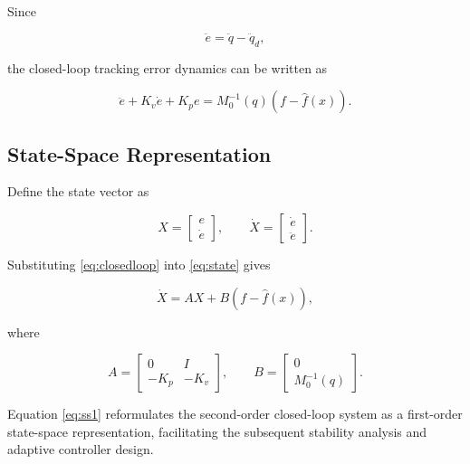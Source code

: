 Since

\begin{equation}
	\ddot e
	=
	\ddot q
	-
	\ddot q_d,
\end{equation}

the closed-loop tracking error dynamics can be written as

\begin{equation}
	\ddot e
	+
	K_v\dot e
	+
	K_pe
	=
	M_0^{-1}(q)
	\left(
	f
	-
	\hat f(x)
	\right).
	\label{eq:closedloop}
\end{equation}


\subsection{State-Space Representation}

Define the state vector as

\begin{equation}
	X
	=
	\begin{bmatrix}
		e\\
		\dot e
	\end{bmatrix},
	\qquad
	\dot X
	=
	\begin{bmatrix}
		\dot e\\
		\ddot e
	\end{bmatrix}.
	\label{eq:state}
\end{equation}

Substituting \eqref{eq:closedloop} into \eqref{eq:state} gives

\begin{equation}
	\dot X
	=
	AX
	+
	B
	\left(
	f
	-
	\hat f(x)
	\right),
	\label{eq:ss1}
\end{equation}

where

\begin{equation}
	A
	=
	\begin{bmatrix}
		0&I\\
		-K_p&-K_v
	\end{bmatrix},
	\qquad
	B
	=
	\begin{bmatrix}
		0\\
		M_0^{-1}(q)
	\end{bmatrix}.
	\label{eq:AB}
\end{equation}

Equation \eqref{eq:ss1} reformulates the second-order closed-loop system as a first-order state-space representation, facilitating the subsequent stability analysis and adaptive controller design.

